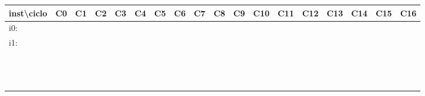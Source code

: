 \documentclass{article}
\begin{document}
\begin{enumerate}
\begin{table}[H]
\begin{tabular}{|l|l|l|l|l|l|l|l|l|l|l|l|l|l|l|l|l|l|}
\hline
inst\textbackslash ciclo & C0  & C1  & C2  & C3  & C4  & C5  & C6  & C7  & C8  & C9  & C10 & C11 & C12 & C13 & C14 & C15 & C16 \\ \hline
i0:  &     &     &     &     &     &     &     &     &     &     &     &     &     &     &     &     &     \\ \hline
i1:  &     &     &     &     &     &     &     &     &     &     &     &     &     &     &     &     &     \\ \hline
  &     &     &     &     &     &     &     &     &     &     &     &     &     &     &     &     &     \\ \hline
  &     &     &     &     &     &     &     &     &     &     &     &     &     &     &     &     &     \\ \hline
  &     &     &     &     &     &     &     &     &     &     &     &     &     &     &     &     &     \\ \hline
  &     &     &     &     &     &     &     &     &     &     &     &     &     &     &     &     &     \\ \hline
  &     &     &     &     &     &     &     &     &     &     &     &     &     &     &     &     &     \\ \hline
  &     &     &     &     &     &     &     &     &     &     &     &     &     &     &     &     &     \\ \hline
  &     &     &     &     &     &     &     &     &     &     &     &     &     &     &     &     &     \\ \hline
  &     &     &     &     &     &     &     &     &     &     &     &     &     &     &     &     &     \\ \hline
 &     &     &     &     &     &     &     &     &     &     &     &     &     &     &     &     &     \\ \hline
 &     &     &     &     &     &     &     &     &     &     &     &     &     &     &     &     &     \\ \hline
 &     &     &     &     &     &     &     &     &     &     &     &     &     &     &     &     &     \\ \hline
 &     &     &     &     &     &     &     &     &     &     &     &     &     &     &     &     &     \\ \hline
 &     &     &     &     &     &     &     &     &     &     &     &     &     &     &     &     &     \\ \hline

\end{tabular}
\end{table}
\end{enumerate}
\end{document}
